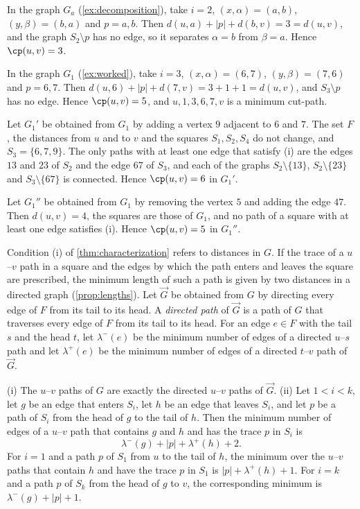 \begin{example}
\label{ex:criterion}
In the graph $G_a$ (\cref{ex:decomposition}), take $i = 2$, $(x, \alpha) = (a, b)$, $(y, \beta) = (b, a)$ and $p = a, b$.
Then $d(u, a) + |p| + d(b, v) = 3 = d(u, v)$, and the graph $S_2 \setminus p$ has no edge, so it separates $\alpha = b$ from $\beta = a$.
Hence $\cp(u, v) = 3$.

In the graph $G_1$ (\cref{ex:worked}), take $i = 3$, $(x, \alpha) = (6, 7)$, $(y, \beta) = (7, 6)$ and $p = 6, 7$.
Then $d(u, 6) + |p| + d(7, v) = 3 + 1 + 1 = d(u, v)$, and $S_3 \setminus p$ has no edge.
Hence $\cp(u, v) = 5$, and $u, 1, 3, 6, 7, v$ is a minimum cut-path.

Let $G_1'$ be obtained from $G_1$ by adding a vertex $9$ adjacent to $6$ and $7$.
The set $F$, the distances from $u$ and to $v$ and the squares $S_1, S_2, S_4$ do not change, and $S_3 = \{6, 7, 9\}$.
The only paths with at least one edge that satisfy (i) are the edges $13$ and $23$ of $S_2$ and the edge $67$ of $S_3$, and each of the graphs $S_2 \setminus \{13\}$, $S_2 \setminus \{23\}$ and $S_3 \setminus \{67\}$ is connected.
Hence $\cp(u, v) = 6$ in $G_1'$.

Let $G_1''$ be obtained from $G_1$ by removing the vertex $5$ and adding the edge $47$.
Then $d(u, v) = 4$, the squares are those of $G_1$, and no path of a square with at least one edge satisfies (i).
Hence $\cp(u, v) = 5$ in $G_1''$.
\end{example}

Condition (i) of \cref{thm:characterization} refers to distances in $G$.
If the trace of a $u$--$v$ path in a square and the edges by which the path enters and leaves the square are prescribed, the minimum length of such a path is given by two distances in a directed graph (\cref{prop:lengths}).
Let $\vec{G}$ be obtained from $G$ by directing every edge of $F$ from its tail to its head.
A \emph{directed path} of $\vec{G}$ is a path of $G$ that traverses every edge of $F$ from its tail to its head.
For an edge $e \in F$ with the tail $s$ and the head $t$, let $\lambda^{-}(e)$ be the minimum number of edges of a directed $u$--$s$ path and let $\lambda^{+}(e)$ be the minimum number of edges of a directed $t$--$v$ path of $\vec{G}$.

\begin{proposition}
\label{prop:lengths}
(i) The $u$--$v$ paths of $G$ are exactly the directed $u$--$v$ paths of $\vec{G}$.
(ii) Let $1 < i < k$, let $g$ be an edge that enters $S_i$, let $h$ be an edge that leaves $S_i$, and let $p$ be a path of $S_i$ from the head of $g$ to the tail of $h$.
Then the minimum number of edges of a $u$--$v$ path that contains $g$ and $h$ and has the trace $p$ in $S_i$ is
\[
\lambda^{-}(g) + |p| + \lambda^{+}(h) + 2.
\]
For $i = 1$ and a path $p$ of $S_1$ from $u$ to the tail of $h$, the minimum over the $u$--$v$ paths that contain $h$ and have the trace $p$ in $S_1$ is $|p| + \lambda^{+}(h) + 1$.
For $i = k$ and a path $p$ of $S_k$ from the head of $g$ to $v$, the corresponding minimum is $\lambda^{-}(g) + |p| + 1$.
\end{proposition}


